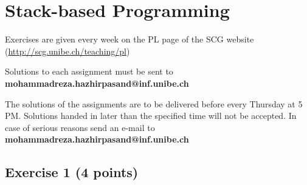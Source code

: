 \documentclass [11pt, a4wide, twoside]{article}
\begin{document}
\section*{\space{} Stack-based Programming}


\begin{myitemize}
\item Exercises are given every week on the PL page of the SCG website \\ (\url{http://scg.unibe.ch/teaching/pl})
\item Solutions to each assignment must be sent to \textbf{mohammadreza.hazhirpasand@inf.unibe.ch}
\item The solutions of the assignments are to be delivered before every Thursday at 5 PM. Solutions handed in later than the specified time will not be accepted. In case of serious reasons send an e-mail to  \textbf{mohammadreza.hazhirpasand@inf.unibe.ch}
\end{myitemize}


\subsection*{Exercise 1 (4 points)}
\end{document}
